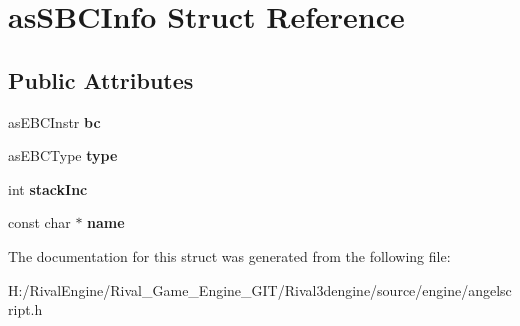 \hypertarget{structas_s_b_c_info}{}\section{as\+S\+B\+C\+Info Struct Reference}
\label{structas_s_b_c_info}
\subsection*{Public Attributes}
\begin{DoxyCompactItemize}
\item 
\mbox{\label{structas_s_b_c_info_a44543d80233f6d2158b300e7049e23ab}} 
as\+E\+B\+C\+Instr {\bfseries bc}
\item 
\mbox{\label{structas_s_b_c_info_aa0579956f325760177250e0eddd52ab4}} 
as\+E\+B\+C\+Type {\bfseries type}
\item 
\mbox{\label{structas_s_b_c_info_afa46372104c863ec52c4f6c5e33eba89}} 
int {\bfseries stack\+Inc}
\item 
\mbox{\label{structas_s_b_c_info_a0fec180d222e297a574000aa64bd3af5}} 
const char $\ast$ {\bfseries name}
\end{DoxyCompactItemize}


The documentation for this struct was generated from the following file\+:\begin{DoxyCompactItemize}
\item 
H\+:/\+Rival\+Engine/\+Rival\+\_\+\+Game\+\_\+\+Engine\+\_\+\+G\+I\+T/\+Rival3dengine/source/engine/angelscript.\+h\end{DoxyCompactItemize}
